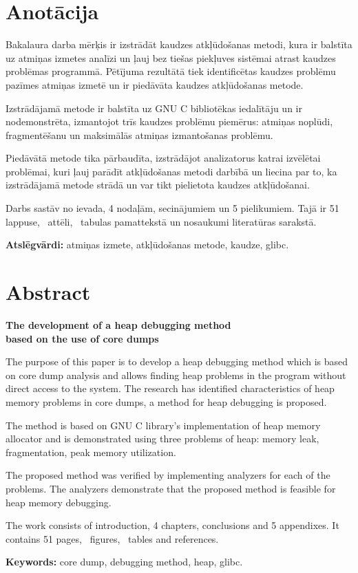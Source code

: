 \chapter*{Anotācija}
\thispagestyle{empty}

Bakalaura darba mērķis ir izstrādāt kaudzes atkļūdošanas metodi, kura ir balstīta uz atmiņas izmetes analīzi un ļauj bez tiešas piekļuves sistēmai atrast kaudzes problēmas programmā.
Pētījuma rezultātā tiek identificētas kaudzes problēmu pazīmes atmiņas izmetē un ir piedāvāta kaudzes atkļūdošanas metode.

Izstrādājamā metode ir balstīta uz GNU C bibliotēkas iedalītāju un ir nodemonstrēta, izmantojot trīs kaudzes problēmu piemērus: atmiņas noplūdi, fragmentēšanu un maksimālās atmiņas izmantošanas problēmu.


Piedāvātā metode tika pārbaudīta, izstrādājot analizatorus katrai izvēlētai problēmai, kuri ļauj parādīt atkļūdošanas metodi darbībā un liecina par to, ka izstrādājamā metode strādā un var tikt pielietota kaudzes atkļūdošanai.

Darbs sastāv no ievada, 4 nodaļām, secinājumiem un 5 pielikumiem. Tajā ir 51 lappuse, \totfig\ attēli, \tottab\ tabulas pamattekstā un  nosaukumi literatūras sarakstā.

\textbf{Atslēgvārdi:} atmiņas izmete, atkļūdošanas metode, kaudze, glibc.

\newpage

\chapter*{Abstract}
\begin{center}
\linespread{1.2}
\vspace{-0.3cm}
\large \textbf {The development of a heap debugging method \protect\\  based on the use of core dumps}
\end{center}

The purpose of this paper is to develop a heap debugging method which is based on core dump analysis and allows finding heap problems in the program without direct access to the system.
The research has identified characteristics of heap memory problems in core dumps, a method for heap debugging is proposed.

The method is based on GNU C library's implementation of heap memory allocator and is demonstrated using three problems of heap: memory leak, fragmentation, peak memory utilization.

The proposed method was verified by implementing analyzers for each of the problems.
The analyzers demonstrate that the proposed method is feasible for heap memory debugging.


\thispagestyle{empty}
	The work consists of introduction, 4 chapters, conclusions and 5 appendixes. It contains 51 pages, \totfig\ figures, \tottab\ tables and  references.

\textbf{Keywords:} core dump, debugging method, heap, glibc.


\newpage 






